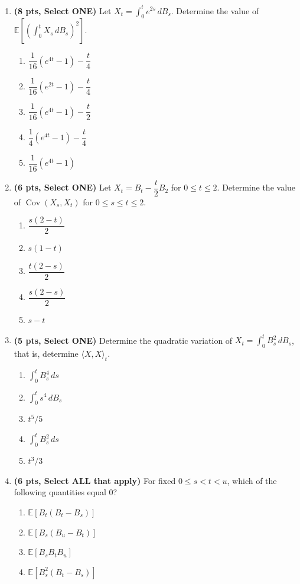 \documentclass[11pt]{article}
\newcommand{\E}{\mathbb{E}}
\DeclareMathOperator{\Cov}{Cov}
\begin{document}
\begin{enumerate}
\item[\textbf{Q9.}] \textbf{(8 pts, Select ONE)} Let $X_t=\int_0^t e^{2s}\,dB_s$. Determine the value of $\displaystyle\E\left[\left(\int_0^t X_s\,dB_s\right)^2\right]$.
\begin{enumerate}
  \item $\dfrac1{16}(e^{4t}-1)-\dfrac t4$
  \item $\dfrac1{16}(e^{2t}-1)-\dfrac t4$
  \item $\dfrac1{16}(e^{4t}-1)-\dfrac t2$
  \item $\dfrac14(e^{4t}-1)-\dfrac t4$
  \item $\dfrac1{16}(e^{4t}-1)$
\end{enumerate}

\item[\textbf{Q10.}] \textbf{(6 pts, Select ONE)} Let $X_t=B_t-\dfrac t2 B_2$ for $0\le t\le 2$. Determine the value of $\Cov(X_s,X_t)$ for $0\le s\le t\le 2$.
\begin{enumerate}
  \item $\dfrac{s(2-t)}2$
  \item $s(1-t)$
  \item $\dfrac{t(2-s)}2$
  \item $\dfrac{s(2-s)}2$
  \item $s-t$
\end{enumerate}

\item[\textbf{Q11.}] \textbf{(5 pts, Select ONE)} Determine the quadratic variation of $X_t=\displaystyle\int_0^t B_s^2\,dB_s$, that is, determine $\langle X,X\rangle_t$.
\begin{enumerate}
  \item $\displaystyle\int_0^t B_s^4\,ds$
  \item $\displaystyle\int_0^t s^4\,dB_s$
  \item $t^5/5$
  \item $\displaystyle\int_0^t B_s^2\,ds$
  \item $t^3/3$
\end{enumerate}

\item[\textbf{Q12.}] \textbf{(6 pts, Select ALL that apply)} For fixed $0\le s<t<u$, which of the following quantities equal $0$?
\begin{enumerate}
  \item $\E[B_t(B_t-B_s)]$
  \item $\E[B_s(B_u-B_t)]$
  \item $\E[B_sB_tB_u]$
  \item $\E[B_s^2(B_t-B_s)]$
\end{enumerate}


\end{enumerate}
\end{document}
